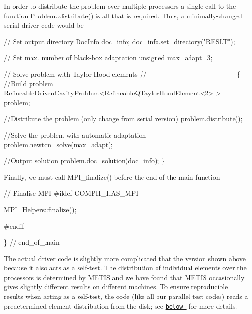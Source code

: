 In order to distribute the problem over multiple processors a single call to the function {\ttfamily Problem\+::distribute()} is all that is required. Thus, a minimally-\/changed serial driver code would be 
\begin{DoxyCode}
\textcolor{comment}{// Set output directory}
DocInfo doc\_info;
doc\_info.set\_directory(\textcolor{stringliteral}{"RESLT"});

\textcolor{comment}{// Set max. number of black-box adaptation}
\textcolor{keywordtype}{unsigned} max\_adapt=3;

\textcolor{comment}{// Solve problem with Taylor Hood elements}
\textcolor{comment}{//---------------------------------------}
\{
 \textcolor{comment}{//Build problem}
 RefineableDrivenCavityProblem<RefineableQTaylorHoodElement<2> > problem;

 \textcolor{comment}{//Distribute the problem (only change from serial version)}
 problem.distribute();         

 \textcolor{comment}{//Solve the problem with automatic adaptation}
 problem.newton\_solve(max\_adapt);

 \textcolor{comment}{//Output solution}
 problem.doc\_solution(doc\_info);
\}
\end{DoxyCode}


Finally, we must call {\ttfamily M\+P\+I\+\_\+finalize()} before the end of the main function  
\begin{DoxyCodeInclude}
\textcolor{comment}{// Finalise MPI}
\textcolor{preprocessor}{#ifdef OOMPH\_HAS\_MPI}

 MPI\_Helpers::finalize();

\textcolor{preprocessor}{#endif}

\} \textcolor{comment}{// end\_of\_main}

\end{DoxyCodeInclude}


The actual driver code is slightly more complicated that the version shown above because it also acts as a self-\/test. The distribution of individual elements over the processors is determined by {\ttfamily M\+E\+T\+IS} and we have found that {\ttfamily M\+E\+T\+IS} occasionally gives slightly different results on different machines. To ensure reproducible results when acting as a self-\/test, the code (like all our parallel test codes) reads a predetermined element distribution from the disk; see \href{#distribution}{\tt below } for more details.




